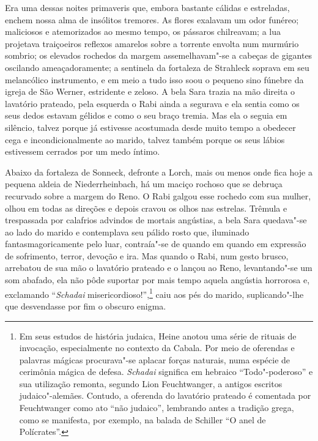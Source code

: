 Era uma dessas noites primaveris que, embora bastante cálidas e
estreladas, enchem nossa alma de insólitos tremores. As flores exalavam
um odor funéreo; maliciosos e atemorizados ao mesmo tempo, os pássaros
chilreavam; a lua projetava traiçoeiros reflexos amarelos sobre a
torrente envolta num murmúrio sombrio; os elevados rochedos da margem
assemelhavam"-se a cabeças de gigantes oscilando ameaçadoramente; a
sentinela da fortaleza de Strahleck soprava em seu melancólico
instrumento, e em meio a tudo isso soou o pequeno sino fúnebre da
igreja de São Werner, estridente e zeloso. A bela Sara trazia na mão
direita o lavatório prateado, pela esquerda o Rabi ainda a segurava e
ela sentia como os seus dedos estavam gélidos e como o seu braço
tremia. Mas ela o seguia em silêncio, talvez porque já estivesse
acostumada desde muito tempo a obedecer cega e incondicionalmente ao
marido, talvez também porque os seus lábios estivessem cerrados por um
medo íntimo.

Abaixo da fortaleza de Sonneck, defronte a Lorch, mais ou menos onde
fica hoje a pequena aldeia de Niederrheinbach, há um maciço rochoso que
se debruça recurvado sobre a margem do Reno. O Rabi galgou esse rochedo
com sua mulher, olhou em todas as direções e depois cravou os olhos nas
estrelas. Trêmula e trespassada por calafrios advindos de mortais
angústias, a bela Sara quedava"-se ao lado do marido e contemplava seu
pálido rosto que, iluminado fantasmagoricamente pelo luar,
contraía"-se de quando em quando em expressão de sofrimento, terror,
devoção e ira. Mas quando o Rabi, num gesto brusco, arrebatou de sua
mão o lavatório prateado e o lançou ao Reno, levantando"-se um som
abafado, ela não pôde suportar por mais tempo aquela angústia horrorosa
e, exclamando ``\textit{Schadai}
misericordioso!'',\footnote{
Em seus estudos de história judaica, Heine anotou uma série de rituais
de invocação, especialmente no contexto da Cabala. Por meio de
oferendas e palavras mágicas procurava"-se aplacar forças naturais,
numa espécie de cerimônia mágica de defesa. \textit{Schadai} significa
em hebraico ``Todo"-poderoso'' e sua utilização remonta, segundo Lion
Feuchtwanger, a antigos escritos judaico"-alemães. Contudo, a oferenda
do lavatório prateado é comentada por Feuchtwanger como ato ``não
judaico'', lembrando antes a tradição grega, como se manifesta, por
exemplo, na balada de Schiller ``O anel de Polícrates''.}
caiu aos pés do marido, suplicando"-lhe que desvendasse por fim o
obscuro enigma.

